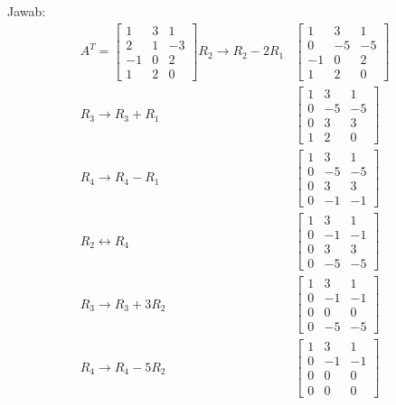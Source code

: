 \documentclass[12pt, a4paper]{scrartcl}
\begin{document}
\begin{enumerate}
\begin{enumerate}
            Jawab:
            \begin{align*}
                A^T=\begin{bmatrix}
                    1&3&1\\2&1&-3\\-1&0&2\\1&2&0
                \end{bmatrix} R_2\to R_2-2R_1 &\begin{bmatrix}
                    1&3&1\\0&-5&-5\\-1&0&2\\1&2&0
                \end{bmatrix} \\R_3\to R_3 + R_1 &\begin{bmatrix}
                    1&3&1\\0&-5&-5\\0&3&3\\1&2&0
                \end{bmatrix} \\R_4\to R_4-R_1 &\begin{bmatrix}
                    1&3&1\\0&-5&-5\\0&3&3\\0&-1&-1
                \end{bmatrix} \\R_2\leftrightarrow R_4 &\begin{bmatrix}
                    1&3&1\\0&-1&-1\\0&3&3\\0&-5&-5
                \end{bmatrix} \\R_3\to R_3+3R_2 &\begin{bmatrix}
                    1&3&1\\0&-1&-1\\0&0&0\\0&-5&-5
                \end{bmatrix} \\R_4\to R_4-5R_2 &\begin{bmatrix}
                    1&3&1\\0&-1&-1\\0&0&0\\0&0&0
                \end{bmatrix}
            \end{align*}


\end{enumerate}
\end{enumerate}
\end{document}
